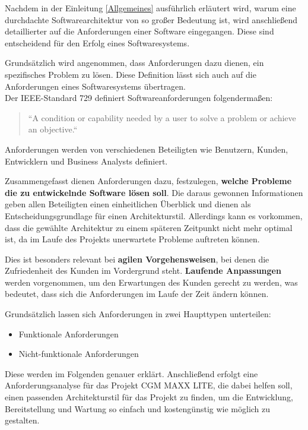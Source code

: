 
Nachdem in der Einleitung \ref{Allgemeines} ausführlich erläutert wird, warum eine durchdachte Softwarearchitektur von so großer Bedeutung ist, wird anschließend detaillierter auf die Anforderungen einer Software eingegangen. Diese sind entscheidend für den Erfolg eines Softwaresystems.

Grundsätzlich wird angenommen, dass Anforderungen dazu dienen, ein spezifisches Problem zu lösen.
Diese Definition lässt sich auch auf die Anforderungen eines Softwaresystems übertragen. \\ 
Der IEEE-Standard 729 definiert Softwareanforderungen folgendermaßen: 

\begin{quote}
    ``A condition or capability needed by a user to solve a problem or achieve an objective.``
    \cite{EA:Web05}
\end{quote}

Anforderungen werden von verschiedenen Beteiligten wie Benutzern, Kunden, Entwicklern und Business Analysts definiert.

Zusammengefasst dienen Anforderungen dazu, festzulegen, \textbf{welche Probleme die zu entwickelnde Software lösen soll}. Die daraus gewonnen Informationen geben allen Beteiligten einen einheitlichen Überblick und dienen als Entscheidungsgrundlage für einen Architekturstil. 
Allerdings kann es vorkommen, dass die gewählte Architektur zu einem späteren Zeitpunkt nicht mehr optimal ist, da im Laufe des Projekts unerwartete Probleme auftreten können. \\
\cite{EA:Web04, EA:Web05} \cite[S. 13-16]{EA:Book02}

Dies ist besonders relevant bei \textbf{agilen Vorgehensweisen}, bei denen die Zufriedenheit des Kunden im Vordergrund steht. 
\textbf{Laufende Anpassungen} werden vorgenommen, um den Erwartungen des Kunden gerecht zu werden, was bedeutet, dass sich die Anforderungen im Laufe der Zeit ändern können.
\cite{EA:Web06}

Grundsätzlich lassen sich Anforderungen in zwei Haupttypen unterteilen:

\begin{itemize}
    \item Funktionale Anforderungen
    \item Nicht-funktionale Anforderungen
\end{itemize}

Diese werden im Folgenden genauer erklärt. Anschließend erfolgt eine Anforderungsanalyse für das Projekt CGM MAXX LITE,
die dabei helfen soll, einen passenden Architekturstil für das Projekt zu finden, um die Entwicklung, Bereitstellung und Wartung so einfach und kostengünstig wie möglich zu gestalten.



